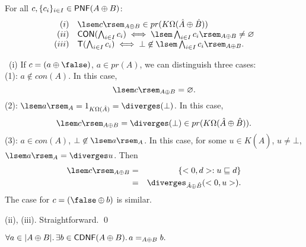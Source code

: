 \begin{proposition}[T1]
For all $c, \{ c_{i} \}_{i \in I} \in {\sf PNF}(A \oplus B)$:
\[ \begin{array}{rl}
(i)   & \lsem c \rsem_{A \oplus B} \in pr(K\Omega (\hat{A} \oplus \hat{B})) \\
(ii)  & {\sf CON}(\bigwedge_{i \in I}c_{i}) \; \Longleftrightarrow \; \lsem \bigwedge_{i \in I}c_{i} \rsem_{A \oplus B} \neq \varnothing \\
(iii) & {\sf T}(\bigwedge_{i \in I}c_{i}) \; \Longleftrightarrow \; \bot \not\in \lsem \bigwedge_{i \in I}c_{i} \rsem_{A \oplus B}.
\end{array} \]
\end{proposition}

\proof\ (i) If $c = (a \oplus \false )$, $a \in pr(A)$, we can distinguish three cases: \\
(1): $a \not\in con(A)$. In this case, 
\[ \lsem c \rsem_{A \oplus B} = \varnothing . \]
(2): $\lsem a \rsem_{A} = 1_{K\Omega (\hat{A})} = \diverges (\bot )$. In this case,
\[ \lsem c \rsem_{A \oplus B} = \diverges (\bot ) \in pr(K\Omega (\hat{A} \oplus \hat{B})). \]
(3): $a \in con(A)$, $\bot \not\in \lsem a \rsem_{A}$. In this case, for some $u \in K(\hat{A})$, $u \neq \bot$, $\lsem a \rsem_{A} = \diverges u$. Then
\begin{eqnarray*}
\lsem c \rsem_{A \oplus B} & = & \{ <0, d> : u \sqsubseteq d \} \\
& = & \diverges_{\hat{A} \oplus \hat{B}}(<0, u>).
\end{eqnarray*} 
The case for $c = (\false \oplus b)$ is similar.

(ii), (iii). Straightforward. \qed

\begin{proposition}[T2]
$\forall a \in |A \oplus B|. \, \exists b \in {\sf CDNF}(A \oplus B). \, a =_{A \oplus B} b.$
\end{proposition}

